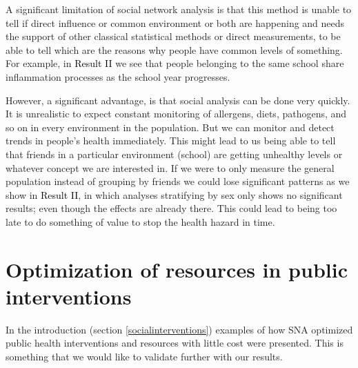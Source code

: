 A significant limitation of social network analysis is that this method is unable to tell if direct influence or common environment or both are happening and needs the support of other classical statistical methods or direct measurements, to be able to tell which are the reasons why people have common levels of something. For example, in \colorbox{ResultColor}{\textcolor{black}{Result II}} we see that people belonging to the same school share inflammation processes as the school year progresses.


However, a significant advantage, is that social analysis can be done very quickly. It is unrealistic to expect constant monitoring of allergens, diets, pathogens, and so on in every environment in the population. But we can monitor and detect trends in people's health immediately. This might lead to us being able to tell that friends in a particular environment (school) are getting unhealthy levels or whatever concept we are interested in. If we were to only measure the general population instead of grouping by friends we could lose significant patterns as we show in \colorbox{ResultColor}{\textcolor{black}{Result II}}, in which analyses stratifying by sex only shows no significant results; even though the effects are already there. This could lead to being too late to do something of value to stop the health hazard in time.

\section{Optimization of resources in public interventions}

In the introduction (section \ref{socialinterventions}) examples of how SNA optimized public health interventions and resources with little cost were presented. This is something that we would like to validate further with our results.

